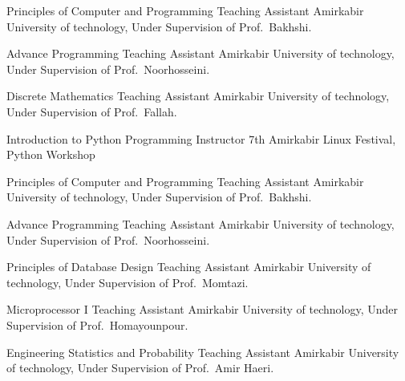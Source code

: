 \documentclass[]{friggeri-cv} %
\begin{document}
\begin{entrylist}

	{Principles of Computer and Programming}
	{Teaching Assistant}
	{Amirkabir University of technology, Under Supervision of Prof.\ Bakhshi.}


	{Advance Programming}
	{Teaching Assistant}
	{Amirkabir University of technology, Under Supervision of Prof.\ Noorhosseini.}


	{Discrete Mathematics}
	{Teaching Assistant}
	{Amirkabir University of technology, Under Supervision of Prof.\ Fallah.}


	{Introduction to Python Programming}
	{Instructor}
	{7th Amirkabir Linux Festival, Python Workshop}


	{Principles of Computer and Programming}
	{Teaching Assistant}
	{Amirkabir University of technology, Under Supervision of Prof.\ Bakhshi.}


	{Advance Programming}
	{Teaching Assistant}
	{Amirkabir University of technology, Under Supervision of Prof.\ Noorhosseini.}


	{Principles of Database Design}
	{Teaching Assistant}
	{Amirkabir University of technology, Under Supervision of Prof.\ Momtazi.}


	{Microprocessor I}
	{Teaching Assistant}
	{Amirkabir University of technology, Under Supervision of Prof.\ Homayounpour.}


	{Engineering Statistics and Probability}
	{Teaching Assistant}
	{Amirkabir University of technology, Under Supervision of Prof.\ Amir Haeri.}



\end{entrylist}
\end{document}
